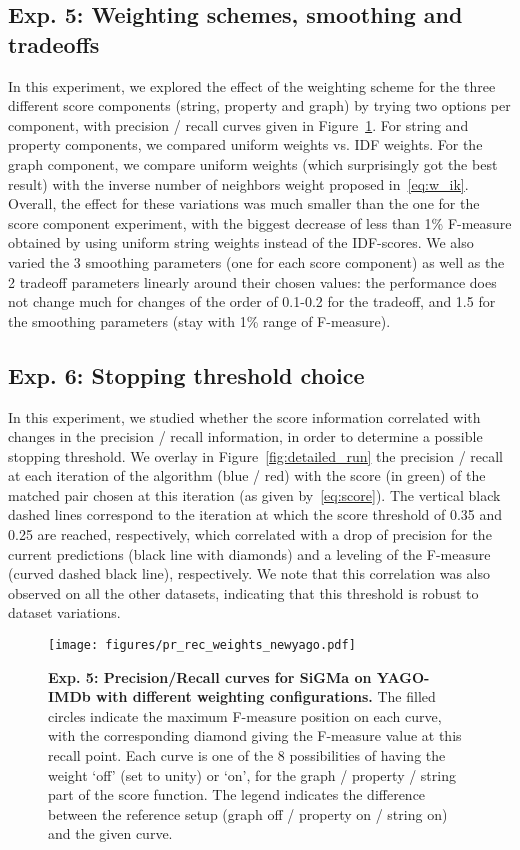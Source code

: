 \documentclass{sig-alternate}
\newcommand{\ts}[1]{\textsf{#1}}
\begin{document}
\begin{appendix}
\subsection{Exp. 5: Weighting schemes, smoothing and tradeoffs}
In this experiment,  we explored the effect of the weighting scheme for the three different score components (string, property and graph) by trying two options per component, with precision / recall curves given in Figure~\ref{fig:test_weights}. For string and property components, we compared uniform weights vs. IDF weights. For the graph component, we compare uniform weights (which surprisingly got the best result) with the inverse number of neighbors weight proposed in~\eqref{eq:w_ik}. Overall, the effect for these variations was much smaller than the one for the score component experiment, with the biggest decrease of less than 1\% F-measure obtained by using uniform string weights instead of the IDF-scores. We also varied the 3 smoothing parameters (one for each score component) as well as the 2 tradeoff parameters linearly around their chosen values: the performance does not change much for changes of the order of 0.1-0.2 for the tradeoff, and 1.5 for the smoothing parameters (stay with 1\% range of F-measure).

\subsection{Exp. 6: Stopping threshold choice}
In this experiment, we studied whether the score information correlated with changes in the precision / recall information, in order to determine a possible stopping threshold. We overlay in Figure~\ref{fig:detailed_run} the precision / recall at each iteration of the algorithm (blue / red) with the score (in green) of the matched pair chosen at this iteration (as given by~\eqref{eq:score}). The vertical black dashed lines correspond to the iteration at which the score threshold of 0.35 and 0.25 are reached, respectively, which correlated with a drop of precision for the current predictions (black line with diamonds) and a leveling of the F-measure (curved dashed black line), respectively. We note that this correlation was also observed on all the other datasets, indicating that this threshold is robust to dataset variations.

\begin{figure}[!t]
	\begin{center}
    \texttt{[image: figures/pr\_rec\_weights\_newyago.pdf]}
    \end{center}
	\caption{\textbf{Exp. 5: Precision/Recall curves for \ts{SiGMa} on \ts{YAGO}-\ts{IMDb} with different weighting configurations.} \textnormal{The filled circles indicate the maximum F-measure position on each curve, with the corresponding diamond giving the F-measure value at this recall point. Each curve is one of the 8 possibilities of having the weight `off' (set to unity) or `on', for the graph / property / string part of the score function. The legend indicates the difference between the reference setup (graph off / property on / string on) and the given curve.} \label{fig:test_weights} }
\end{figure}


\end{appendix}
\end{document}
